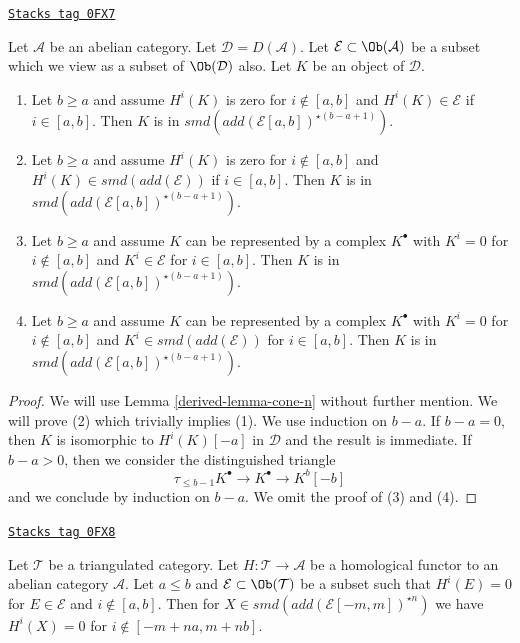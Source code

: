 \begin{lemma}[In cone n]
\label{derived-lemma-in-cone-n}
\href{https://stacks.math.columbia.edu/tag/0FX7}{\texttt{Stacks tag 0FX7}}

Let $\mathcal{A}$ be an abelian category. Let $\mathcal{D} = D(\mathcal{A})$.
Let $\mathcal{E} \subset \Ob(\mathcal{A})$ be a subset which we view as
a subset of $\Ob(\mathcal{D})$ also. Let $K$ be an object of $\mathcal{D}$.
\begin{enumerate}
\item Let $b \geq a$ and assume $H^i(K)$ is zero for $i \not \in [a, b]$
and $H^i(K) \in \mathcal{E}$ if $i \in [a, b]$. Then $K$ is in
$smd(add(\mathcal{E}[a, b])^{\star (b - a + 1)})$.
\item Let $b \geq a$ and assume $H^i(K)$ is zero for $i \not \in [a, b]$
and $H^i(K) \in smd(add(\mathcal{E}))$ if $i \in [a, b]$. Then $K$ is in
$smd(add(\mathcal{E}[a, b])^{\star (b - a + 1)})$.
\item Let $b \geq a$ and assume $K$ can be represented by a complex $K^\bullet$
with $K^i = 0$ for $i \not \in [a, b]$ and $K^i \in \mathcal{E}$ for
$i \in [a, b]$. Then $K$ is in
$smd(add(\mathcal{E}[a, b])^{\star (b - a + 1)})$.
\item Let $b \geq a$ and assume $K$ can be represented by a complex $K^\bullet$
with $K^i = 0$ for $i \not \in [a, b]$ and $K^i \in smd(add(\mathcal{E}))$ for
$i \in [a, b]$. Then $K$ is in
$smd(add(\mathcal{E}[a, b])^{\star (b - a + 1)})$.
\end{enumerate}
\end{lemma}

\begin{proof}

We will use Lemma \ref{derived-lemma-cone-n} without further mention.
We will prove (2) which trivially implies (1). We use induction
on $b - a$. If $b - a = 0$, then $K$ is isomorphic to $H^i(K)[-a]$
in $\mathcal{D}$ and the result is immediate. If $b - a > 0$, then
we consider the distinguished triangle
$$
\tau_{\leq b - 1}K^\bullet \to K^\bullet \to K^b[-b]
$$
and we conclude by induction on $b - a$. We omit the proof of (3) and (4).
\end{proof}

\begin{lemma}
\label{derived-lemma-forward-cone-n}
\href{https://stacks.math.columbia.edu/tag/0FX8}{\texttt{Stacks tag 0FX8}}

Let $\mathcal{T}$ be a triangulated category. Let
$H : \mathcal{T} \to \mathcal{A}$ be a homological functor
to an abelian category $\mathcal{A}$.
Let $a \leq b$ and $\mathcal{E} \subset \Ob(\mathcal{T})$
be a subset such that $H^i(E) = 0$ for $E \in \mathcal{E}$
and $i \not \in [a, b]$.
Then for $X \in smd(add(\mathcal{E}[-m, m])^{\star n})$
we have $H^i(X) = 0$ for $i \not \in [-m + na, m + nb]$.
\end{lemma}

